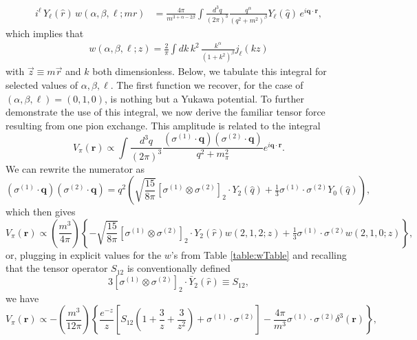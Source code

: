 \documentclass[%
 preprint,
 amsmath,amssymb,
 aps,
]{revtex4-1}
\begin{document}
\begin{align}
i^\ell \, Y_\ell(\hat{r}) \, w(\alpha,\beta,\ell; m r)  &= \frac{4 \pi}{m^{3+\alpha-2\beta} }  \int \frac{d^3 q}{(2\pi)^3} \frac{q^\alpha}{(q^2+m^2)^\beta} Y_\ell(\hat{q}) \, e^{i \mathbf{q} \cdot \mathbf{r}  },
\end{align}
which implies that
\begin{align}\label{eq:wDef}
w(\alpha,\beta,\ell; z) =  \frac{2}{\pi} \int dk \, k^2 \, \frac{k^\alpha}{(1+k^2)^\beta} j_\ell(k z)
\end{align}
with $\vec{z} \equiv m \vec{r}$ and $k$ both dimensionless. Below, we tabulate this integral for selected values of $\alpha, \beta, \ell$. The first function we recover, for the case of $(\alpha, \beta, \ell ) = (0,1,0)$, is nothing but a Yukawa potential. To further demonstrate the use of this integral, we now derive the familiar tensor force resulting from one pion exchange. This amplitude is related to the integral
\begin{equation} 
V_\pi( \mathbf{r}) \propto  \int \frac{d^3 q } {(2 \pi)^3 } \frac{(\sigma^{(1)} \cdot \mathbf{q} ) (\sigma^{(2)} \cdot \mathbf{q} ) } {q^2+m_\pi^2} e^{i \mathbf{q} \cdot \mathbf{r} }. 
\end{equation}
We can rewrite the numerator as
\begin{equation} (\sigma^{(1)} \cdot \mathbf{q}) ( \sigma^{(2)} \cdot \mathbf{q} )= q^2 \left( \sqrt{\frac{15}{8\pi}} [\sigma^{(1)} \otimes \sigma^{(2)}]_2 \cdot Y_2(\hat{q}) + \tfrac{1}{3} \sigma^{(1)} \cdot \sigma^{(2)}  Y_0(\hat{q}) \right),\end{equation}
which then gives
\begin{equation} V_\pi( \mathbf{r}) \propto \left(\frac{m^3}{4 \pi}\right) \left\{ -  \sqrt{\frac{15}{8\pi}} [\sigma^{(1)} \otimes \sigma^{(2)}]_2 \cdot Y_2(\hat{r}) w(2,1,2; z) + \tfrac{1}{3} \sigma^{(1)} \cdot \sigma^{(2)} w(2,1,0; z ) \right\},  \end{equation}
or, plugging in explicit values for the $w$'s from Table \ref{table:wTable} and recalling that the tensor operator $S_{12}$ is conventionally defined
\begin{equation} 3 [\sigma^{(1)} \otimes \sigma^{(2)}]_2 \cdot \bar{Y}_2(\hat{r}) \equiv S_{12}, \end{equation}
we have
\begin{equation} V_\pi( \mathbf{r}) \propto -\left(\frac{m^3}{12 \pi}\right) \left\{ \frac{e^{-z}}{z} \left[ S_{12}\left(1+\frac{3}{z}+ \frac{3}{z^2} \right) +  \sigma^{(1)} \cdot \sigma^{(2)} \right] - \frac{4\pi }{m^3}  \sigma^{(1)} \cdot \sigma^{(2)} \delta^3(\mathbf{r}) \right\}, 
\end{equation}
\end{document}

